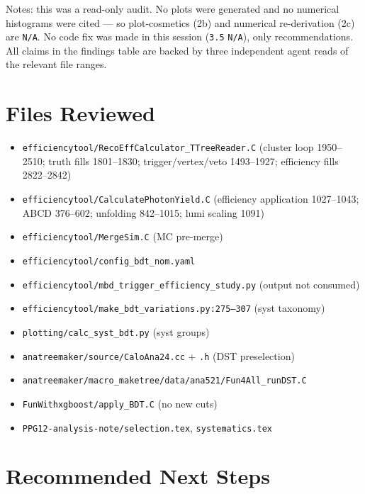 \documentclass[11pt,a4paper]{article}
\begin{document}
Notes: this was a read-only audit. No plots were generated and no
numerical histograms were cited --- so plot-cosmetics (2b) and
numerical re-derivation (2c) are \texttt{N/A}. No code fix was made
in this session (\texttt{3.5} \texttt{N/A}), only recommendations. All
claims in the findings table are backed by three independent agent
reads of the relevant file ranges.

\section{Files Reviewed}

\begin{itemize}
  \item \texttt{efficiencytool/RecoEffCalculator\_TTreeReader.C}
  (cluster loop 1950--2510; truth fills 1801--1830; trigger/vertex/veto
  1493--1927; efficiency fills 2822--2842)
  \item \texttt{efficiencytool/CalculatePhotonYield.C}
  (efficiency application 1027--1043; ABCD 376--602; unfolding 842--1015;
  lumi scaling 1091)
  \item \texttt{efficiencytool/MergeSim.C} (MC pre-merge)
  \item \texttt{efficiencytool/config\_bdt\_nom.yaml}
  \item \texttt{efficiencytool/mbd\_trigger\_efficiency\_study.py}
  (output not consumed)
  \item \texttt{efficiencytool/make\_bdt\_variations.py:275--307}
  (syst taxonomy)
  \item \texttt{plotting/calc\_syst\_bdt.py} (syst groups)
  \item \texttt{anatreemaker/source/CaloAna24.cc} +
  \texttt{.h} (DST preselection)
  \item \texttt{anatreemaker/macro\_maketree/data/ana521/Fun4All\_runDST.C}
  \item \texttt{FunWithxgboost/apply\_BDT.C} (no new cuts)
  \item \texttt{PPG12-analysis-note/selection.tex},
  \texttt{systematics.tex}
\end{itemize}

\section{Recommended Next Steps}
\end{document}
